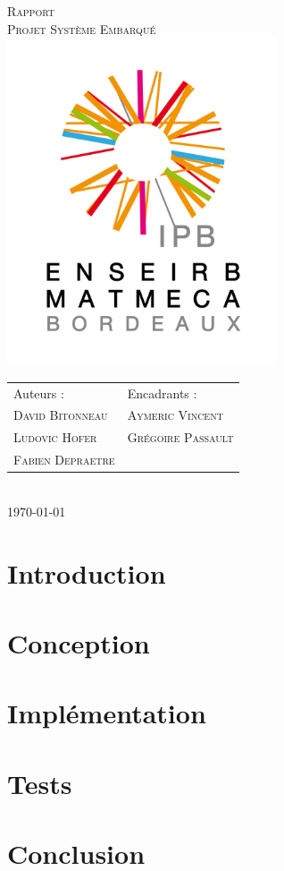 \documentclass[a4paper, 11pt]{article}
\begin{document}
\begin{titlepage}
  \begin{center}
    \textsc{\huge Rapport}\\[3cm]
	\textsc{\Huge Projet Système Embarqué}\\[3cm]
    \includegraphics[width=8cm]{logo-IPB.jpg}\\[3cm]
	\begin{tabular*}{\textwidth}{@{} m{12cm} l}
		\large{Auteurs :} & \large{Encadrants :} \\[0.5cm]
	    \textsc{\Large David Bitonneau} & \textsc{\Large Aymeric Vincent} \\
	    \textsc{\Large Ludovic Hofer}   & \textsc{\Large Grégoire Passault} \\ 
      \textsc{\Large Fabien Depraetre} & \\
    \end{tabular*}
	\\[2cm]
    \textsc{\Large \today}\\

\end{center}

\end{titlepage}

\clearpage
\tableofcontents
\clearpage

\section{Introduction}


\section{Conception}


\section{Implémentation}


\section{Tests}


\section{Conclusion}

\end{document}
